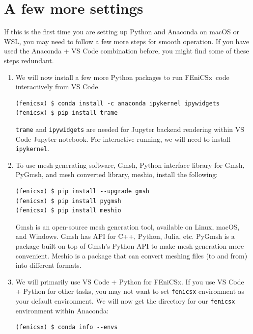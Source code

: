 \documentclass[12pt]{article}
\newcommand{\fenicsx}{\textsf{FEniCSx}}
\begin{document}
\section*{A few more settings}

If this is the first time you are setting up Python and Anaconda on macOS or WSL, you may need to follow a few more steps for smooth operation. If you have used the Anaconda + VS Code combination before, you might find some of these steps redundant.

\begin{enumerate}[label={\arabic*.}, leftmargin= 0.6 cm,itemsep = 0.2cm,topsep=.2cm, parsep=0.2cm]


\item We will now install a few more Python packages to run \fenicsx \ code interactively from VS Code.

\begin{lstlisting}[style=terminal]
(fenicsx) $ conda install -c anaconda ipykernel ipywidgets
(fenicsx) $ pip install trame
\end{lstlisting}

\texttt{trame} and \texttt{ipywidgets} are needed for Jupyter backend rendering within VS Code Jupyter notebook. For interactive running, we will need to install \texttt{ipykernel}.

\item To use mesh generating software, Gmsh, Python interface library for Gmsh, PyGmsh, and mesh converted library, meshio, install the following:
\begin{lstlisting}[style=terminal]
(fenicsx) $ pip install --upgrade gmsh
(fenicsx) $ pip install pygmsh
(fenicsx) $ pip install meshio
\end{lstlisting}

Gmsh is an open-source mesh generation tool, available on Linux, macOS, and Windows. Gmsh has API for C++, Python, Julia, etc. PyGmsh is a package built on top of Gmsh's Python API to make mesh generation more convenient. Meshio is a package that can convert meshing files (to and from) into different formats.

\item We will primarily use VS Code + Python for \fenicsx. If you use VS Code + Python for other tasks, you may not want to set \texttt{fenicsx} environment as your default environment. We will now get the directory for our \texttt{fenicsx} environment within Anaconda:

\begin{lstlisting}[style=terminal]
(fenicsx) $ conda info --envs
\end{lstlisting}


\end{enumerate}
\end{document}
